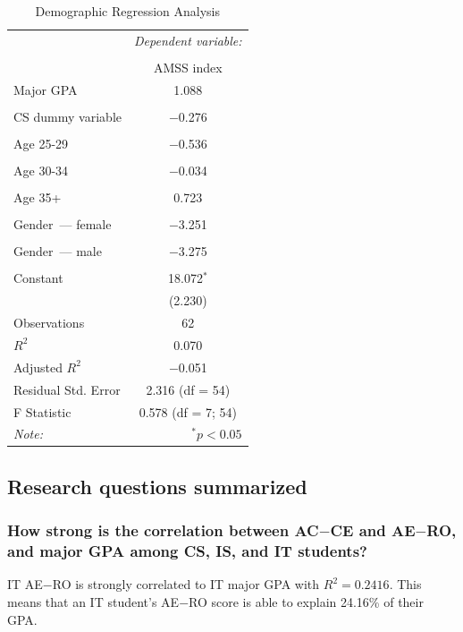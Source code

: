 \begin{table}[!htbp] \centering
  \caption{Demographic Regression Analysis}
  \label{tab:c-demographics}
  \begin{tabular}{@{\extracolsep{5pt}}lc}
    \toprule
     & \multicolumn{1}{c}{\textit{Dependent variable:}} \\
    \cline{2-2}
    \\[-1.8ex] & AMSS index \\
    \midrule
    Major GPA & 1.088 \\
    &  \\
    CS dummy variable & $-$0.276 \\
    &  \\
    Age 25-29 & $-$0.536 \\
    &  \\
    Age 30-34 & $-$0.034 \\
    &  \\
    Age 35+ & 0.723 \\
    &  \\
    Gender~--- female & $-$3.251 \\
    &  \\
    Gender~--- male & $-$3.275 \\
    &  \\
    Constant & 18.072$^{*}$ \\
    & (2.230) \\
    \midrule
    Observations & 62 \\
    $R^{2}$ & 0.070 \\
    Adjusted $R^{2}$ & $-$0.051 \\
    Residual Std. Error & 2.316 (df = 54) \\
    F Statistic & 0.578 (df = 7; 54) \\
    \bottomrule
    \textit{Note:}  & \multicolumn{1}{r}{$^{*}p<0.05$} \\
  \end{tabular}
\end{table}

\subsection{Research questions summarized}
\subsubsection{How strong is the correlation between AC$-$CE and AE$-$RO, and major GPA among CS, IS, and IT students?}
IT AE$-$RO is strongly correlated to IT major GPA with $R^2=0.2416$. This means that an IT student's AE$-$RO score is able to explain 24.16\% of their GPA.

